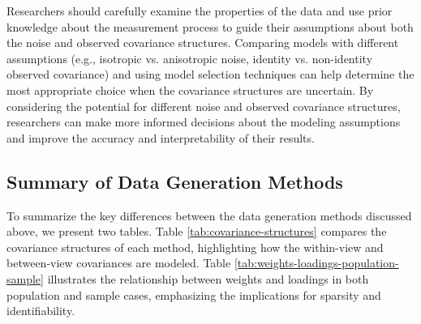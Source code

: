 Researchers should carefully examine the properties of the data and use prior knowledge about the measurement process to guide their assumptions about both the noise and observed covariance structures. Comparing models with different assumptions (e.g., isotropic vs. anisotropic noise, identity vs. non-identity observed covariance) and using model selection techniques can help determine the most appropriate choice when the covariance structures are uncertain. By considering the potential for different noise and observed covariance structures, researchers can make more informed decisions about the modeling assumptions and improve the accuracy and interpretability of their results.

\subsection{Summary of Data Generation Methods}

To summarize the key differences between the data generation methods discussed above, we present two tables. Table \ref{tab:covariance-structures} compares the covariance structures of each method, highlighting how the within-view and between-view covariances are modeled. Table \ref{tab:weights-loadings-population-sample} illustrates the relationship between weights and loadings in both population and sample cases, emphasizing the implications for sparsity and identifiability.

\renewcommand{\arraystretch}{2.5} %
\begin{table}[h]
    \centering
    \caption{Covariance Structures in Data Generation Methods}
    \label{tab:covariance-structures}
\end{table}

